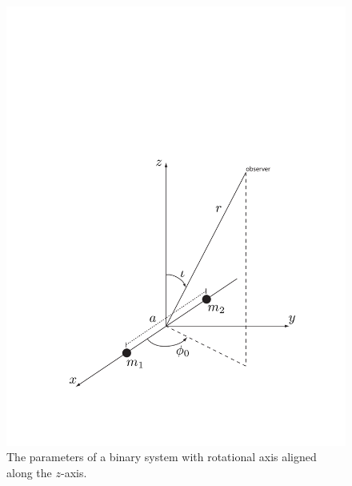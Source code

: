 \begin{figure}[p]
\label{f:binary}
\begin{center}
\includegraphics[width=\linewidth]{figures/inspiral/binary}
\end{center}
\caption[Coordinates Used to Describe Gravitational Radiation from a Binary]{%
The parameters of a binary system with rotational axis aligned along the
$z$-axis.
}
\end{figure}


